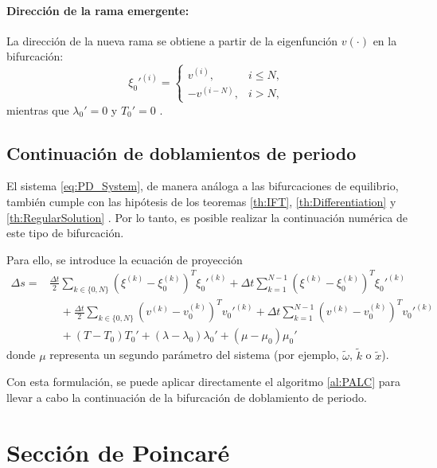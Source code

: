 \paragraph{Dirección de la rama emergente:}
La dirección de la nueva rama se obtiene a partir de la eigenfunción \(v(\cdot)\) en la bifurcación:
\begin{equation}
    \xi_0'^{(i)} =
    \begin{cases}
        v^{(i)},    & i \leq N, \\[1mm]
        -v^{(i-N)}, & i > N,
    \end{cases}
    \label{eq:2T_direction}
\end{equation}
mientras que \(\lambda_0' = 0\) y \(T_0' = 0\) \cite{Meijer2011}.

\subsection{Continuación de doblamientos de periodo}

El sistema \eqref{eq:PD_System}, de manera análoga a las bifurcaciones de equilibrio, también cumple con las hipótesis de los teoremas
\ref{th:IFT}, \ref{th:Differentiation} y \ref{th:RegularSolution} \cite{Meijer2011}. Por lo tanto, es posible realizar la continuación numérica de este tipo de bifurcación.

Para ello, se introduce la ecuación de proyección
\begin{align}
    \Delta s = & \frac{\Delta t}{2} \sum_{k \in \{0, N\}}
    (\xi^{(k)} - \xi_0^{(k)})^{T} \xi_0'^{(k)}
    + \Delta t \sum_{k=1}^{N-1} (\xi^{(k)} - \xi_0^{(k)})^{T} \xi_0'^{(k)} \nonumber \\
               & \quad + \frac{\Delta t}{2} \sum_{k \in \{0, N\}}
    (v^{(k)} - v_0^{(k)})^{T} v_0'^{(k)}
    + \Delta t \sum_{k=1}^{N-1} (v^{(k)} - v_0^{(k)})^{T} v_0'^{(k)} \nonumber       \\
               & \quad + (T - T_0) T_0'
    + (\lambda - \lambda_0) \lambda_0'
    + (\mu - \mu_0) \mu_0'
\end{align}
donde \(\mu\) representa un segundo parámetro del sistema (por ejemplo, \(\tilde{\omega}\), \(\tilde{k}\) o \(\tilde{x}\)).

Con esta formulación, se puede aplicar directamente el algoritmo \ref{al:PALC} para llevar a
cabo la continuación de la bifurcación de doblamiento de periodo.

\section{Sección de Poincaré}

